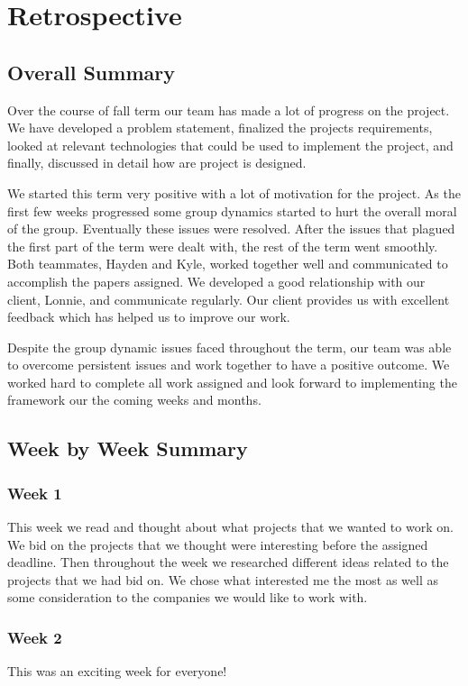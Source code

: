 \documentclass[draftclsnofoot, onecolumn, compsoc, 10pt]{IEEEtran}
\begin{document}
\section{Retrospective}
\subsection{Overall Summary}
Over the course of fall term our team has made a lot of progress on the project. We have developed a problem statement, finalized the projects requirements, looked at relevant technologies that could be used to implement the project, and finally, discussed in detail how are project is designed. 

We started this term very positive with a lot of motivation for the project. As the first few weeks progressed some group dynamics started to hurt the overall moral of the group. Eventually these issues were resolved. After the issues that plagued the first part of the term were dealt with, the rest of the term went smoothly. Both teammates, Hayden and Kyle, worked together well and communicated to accomplish the papers assigned. We developed a good relationship with our client, Lonnie, and communicate regularly. Our client provides us with excellent feedback which has helped us to improve our work.

Despite the group dynamic issues faced throughout the term, our team was able to overcome persistent issues and work together to have a positive outcome. We worked hard to complete all work assigned and look forward to implementing the framework our the coming weeks and months.


\subsection{Week by Week Summary}
\subsubsection{Week 1}
This week we read and thought about what projects that we wanted to work on. We bid on the projects that we thought were interesting before the assigned deadline. Then throughout the week we researched different ideas related to the projects that we had bid on. We chose what interested me the most as well as some consideration to the companies we would like to work with.  

\subsubsection{Week 2}
This was an exciting week for everyone!
\end{document}
